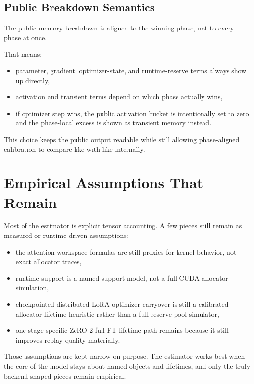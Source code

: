 \subsection{Public Breakdown Semantics}
The public memory breakdown is aligned to the winning phase, not to every phase
at once.

That means:
\begin{itemize}[leftmargin=1.5em]
\item parameter, gradient, optimizer-state, and runtime-reserve terms always
show up directly,
\item activation and transient terms depend on which phase actually wins,
\item if optimizer step wins, the public activation bucket is intentionally set
to zero and the phase-local excess is shown as transient memory instead.
\end{itemize}

This choice keeps the public output readable while still allowing phase-aligned
calibration to compare like with like internally.

\section{Empirical Assumptions That Remain}
Most of the estimator is explicit tensor accounting. A few pieces still remain
as measured or runtime-driven assumptions:
\begin{itemize}[leftmargin=1.5em]
\item the attention workspace formulas are still proxies for kernel behavior,
not exact allocator traces,
\item runtime support is a named support model, not a full CUDA allocator
simulation,
\item checkpointed distributed LoRA optimizer carryover is still a calibrated
allocator-lifetime heuristic rather than a full reserve-pool simulator,
\item one stage-specific ZeRO-2 full-FT lifetime path remains because it still
improves replay quality materially.
\end{itemize}

Those assumptions are kept narrow on purpose. The estimator works best when the
core of the model stays about named objects and lifetimes, and only the truly
backend-shaped pieces remain empirical.
